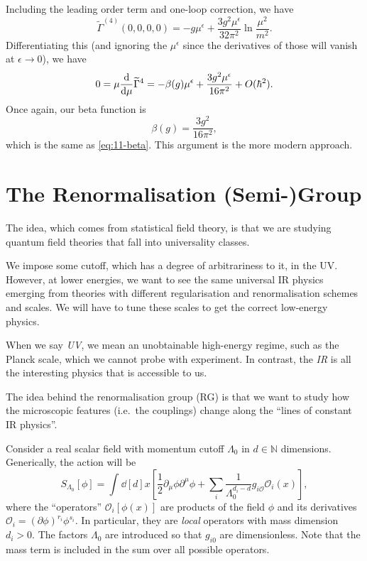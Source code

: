Including the  leading order term and one-loop correction, we have
\begin{equation}
  \widetilde{\Gamma}^{(4)}(0,0,0,0) = - g \mu^\epsilon + \frac{3 g^2 \mu^\epsilon}{32 \pi^2} \ln \frac{\mu^2}{m^2}.
\end{equation}
Differentiating this (and ignoring the $\mu^\epsilon$ since the derivatives of those will vanish at $\epsilon \to 0$), we have
\begin{equation}
  0 = \mu \dv{\mu} \widetilde{\Gamma}^4 = - \beta(g) \mu^\epsilon + \frac{3 g^2 \mu^\epsilon}{16 \pi^2} + O(\hbar^2).
\end{equation}
Once again, our beta function is
\begin{equation}
  \beta(g) = \frac{3 g^2}{16 \pi^2},
\end{equation}
which is the same as \eqref{eq:11-beta}.
This argument is the more modern approach.

\chapter{The Renormalisation (Semi-)Group}%
\label{cha:the_renormalisation_semi_group}

The idea, which comes from statistical field theory, is that we are studying quantum field theories that fall into universality classes.

We impose some cutoff, which has a degree of arbitrariness to it, in the UV. However, at lower energies, we want to see the same universal IR physics emerging from theories with different regularisation and renormalisation schemes and scales.
We will have to tune these scales to get the correct low-energy physics.

\begin{remark}
  When we say \emph{UV}, we mean an unobtainable high-energy regime, such as the Planck scale, which we cannot probe with experiment.
  In contrast, the \emph{IR} is all the interesting physics that is accessible to us.
\end{remark}

The idea behind the renormalisation group (RG) is that we want to study how the microscopic features (i.e.~the couplings) change along the ``lines of constant IR physics''.

Consider a real scalar field with momentum cutoff $\Lambda_0$ in $d \in \mathbb{N}$ dimensions.
Generically, the action will be
\begin{equation}
  S_{\Lambda_0} [\phi] = \int_{}^{}\dd[d]{x} \left[ \frac{1}{2} \partial_{\mu} \phi \partial^{\mu} \phi + \sum_{i} \frac{1}{\Lambda_0^{d_i - d}} g_{i\mathcal{O}} \mathcal{O}_i(x) \right],
\end{equation}
where the ``operators'' $\mathcal{O}_i[\phi(x)]$ are products of the field $\phi$ and its derivatives $ \mathcal{O}_i = (\partial \phi)^{r_i} \phi^{s_i}$.
In particular, they are \emph{local} operators with mass dimension $d_i > 0$. 
The factors $\Lambda_0$ are introduced so that $g_{i0}$ are dimensionless.
Note that the mass term is included in the sum over all possible operators.

